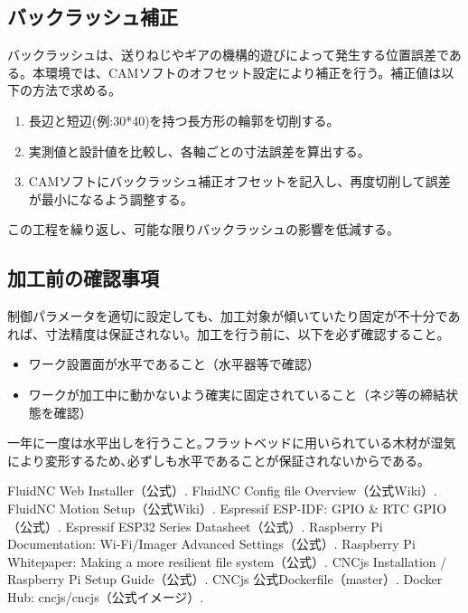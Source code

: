 \documentclass[uplatex,dvipdfmx]{ujarticle}
\begin{document}
\subsection{バックラッシュ補正}
バックラッシュは、送りねじやギアの機構的遊びによって発生する位置誤差である。本環境では、CAMソフトのオフセット設定により補正を行う。補正値は以下の方法で求める。

\begin{enumerate}
    \item 長辺と短辺(例:30*40)を持つ長方形の輪郭を切削する。
    \item 実測値と設計値を比較し、各軸ごとの寸法誤差を算出する。
    \item CAMソフトにバックラッシュ補正オフセットを記入し、再度切削して誤差が最小になるよう調整する。
\end{enumerate}

この工程を繰り返し、可能な限りバックラッシュの影響を低減する。

\subsection{加工前の確認事項}
制御パラメータを適切に設定しても、加工対象が傾いていたり固定が不十分であれば、寸法精度は保証されない。加工を行う前に、以下を必ず確認すること。
\begin{itemize}
    \item ワーク設置面が水平であること（水平器等で確認）
    \item ワークが加工中に動かないよう確実に固定されていること（ネジ等の締結状態を確認）
\end{itemize}
一年に一度は水平出しを行うこと｡フラットベッドに用いられている木材が湿気により変形するため､必ずしも水平であることが保証されないからである｡

\begin{thebibliography}{999}
 FluidNC Web Installer（公式）.
 FluidNC Config file Overview（公式Wiki）.
 FluidNC Motion Setup（公式Wiki）.
 Espressif ESP-IDF: GPIO \& RTC GPIO（公式）.
 Espressif ESP32 Series Datasheet（公式）.
 Raspberry Pi Documentation: Wi-Fi/Imager Advanced Settings（公式）.
 Raspberry Pi Whitepaper: Making a more resilient file system（公式）.
 CNCjs Installation / Raspberry Pi Setup Guide（公式）.
 CNCjs 公式Dockerfile（master）.
 Docker Hub: cncjs/cncjs（公式イメージ）.
\end{thebibliography}
\end{document}
